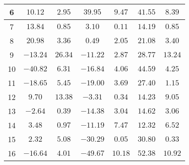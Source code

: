 \begin{table}[H]
\begin{tabular}{|c|c|c|c|c|c|c|}
                        6   &   $10.12$   &  $2.95$  &  $39.95$   &   $9.47$   &  $41.55$  &  $8.39$   \\ \hline
                        7   &   $13.84$   &  $0.85$  &  $3.10$    &   $0.11$   &  $14.19$  &  $0.85$   \\ \hline
                        8   &   $20.98$   &  $3.36$  &  $0.49$    &   $2.05$   &  $21.08$  &  $3.40$   \\ \hline
                        9   &   $-13.24$  &  $26.34$ &  $-11.22$  &   $2.87$   &  $28.77$  &  $13.24$  \\ \hline
                        10  &   $-40.82$  &  $6.31$  &  $-16.84$  &   $4.06$   &  $44.59$  &  $4.25$   \\ \hline
                        11  &   $-18.65$  &  $5.45$  &  $-19.00$  &   $3.69$   &  $27.40$  &  $1.15$   \\ \hline
                        12  &   $9.70$    &  $13.38$ &  $-3.31$   &   $0.34$   &  $14.23$  &  $9.05$   \\ \hline
                        13  &   $-2.64$   &  $0.39$  &  $-14.38$  &   $3.04$   &  $14.62$  &  $3.06$   \\ \hline
                        14  &   $3.48$    &  $0.97$  &  $-11.19$  &   $7.47$   &  $12.32$  &  $6.52$   \\ \hline
                        15  &   $2.32$    &  $5.08$  &  $-30.29$  &   $0.05$   &  $30.80$  &  $0.33$   \\ \hline
                        16  &   $-16.64$  &  $4.01$  &  $-49.67$  &   $10.18$  &  $52.38$  &  $10.92$  \\ \hline
                    \end{tabular}
    \label{tab:media_fisica_4_total}
\end{table}
